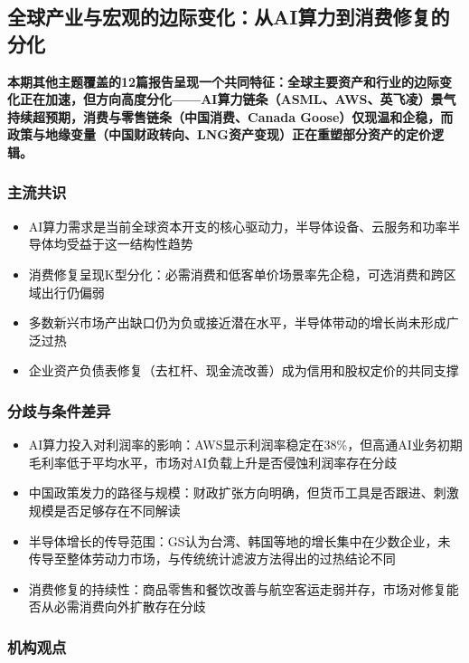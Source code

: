 \documentclass[11pt]{ctexart}
\begin{document}
\subsection{全球产业与宏观的边际变化：从AI算力到消费修复的分化}
\textbf{本期其他主题覆盖的12篇报告呈现一个共同特征：全球主要资产和行业的边际变化正在加速，但方向高度分化——AI算力链条（ASML、AWS、英飞凌）景气持续超预期，消费与零售链条（中国消费、Canada Goose）仅现温和企稳，而政策与地缘变量（中国财政转向、LNG资产变现）正在重塑部分资产的定价逻辑。}
\subsubsection*{主流共识}
\begin{itemize}
  \item AI算力需求是当前全球资本开支的核心驱动力，半导体设备、云服务和功率半导体均受益于这一结构性趋势
  \item 消费修复呈现K型分化：必需消费和低客单价场景率先企稳，可选消费和跨区域出行仍偏弱
  \item 多数新兴市场产出缺口仍为负或接近潜在水平，半导体带动的增长尚未形成广泛过热
  \item 企业资产负债表修复（去杠杆、现金流改善）成为信用和股权定价的共同支撑
\end{itemize}
\subsubsection*{分歧与条件差异}
\begin{itemize}
  \item AI算力投入对利润率的影响：AWS显示利润率稳定在38\%，但高通AI业务初期毛利率低于平均水平，市场对AI负载上升是否侵蚀利润率存在分歧
  \item 中国政策发力的路径与规模：财政扩张方向明确，但货币工具是否跟进、刺激规模是否足够存在不同解读
  \item 半导体增长的传导范围：GS认为台湾、韩国等地的增长集中在少数企业，未传导至整体劳动力市场，与传统统计滤波方法得出的过热结论不同
  \item 消费修复的持续性：商品零售和餐饮改善与航空客运走弱并存，市场对修复能否从必需消费向外扩散存在分歧
\end{itemize}
\subsubsection*{机构观点}
\end{document}
